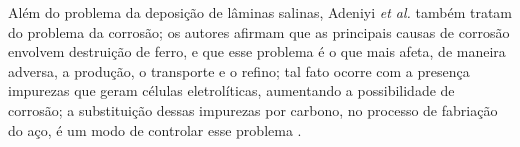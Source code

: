 Al\'{e}m do problema da deposi\c{c}\~{a}o de l\^{a}minas salinas, Adeniyi \textit{et al.} tamb\'{e}m tratam do problema da corros\~{a}o; os autores afirmam que as principais causas de corros\~{a}o envolvem destrui\c{c}\~{a}o de ferro, e que esse problema \'{e} o que mais afeta, de maneira adversa, a produ\c{c}\~{a}o, o transporte e o refino; tal fato ocorre com a presen\c{c}a impurezas que geram c\'{e}lulas eletrol\'{i}ticas, aumentando a possibilidade de corros\~{a}o; a substitui\c{c}\~{a}o dessas impurezas por carbono, no processo de fabria\c{c}\~{a}o do a\c{c}o, \'{e} um modo de controlar esse problema \cite{adeniyi2008}.